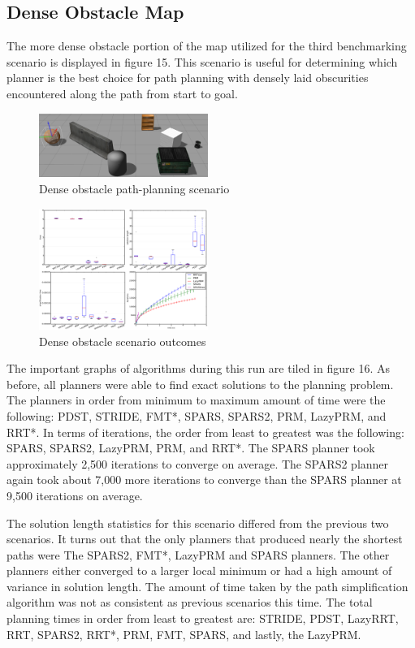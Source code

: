 \documentclass[conference]{IEEEtran} \usepackage[T1]{fontenc} \usepackage[backend=biber, style=ieee]{biblatex}
\begin{document}
\subsection{Dense Obstacle Map} \label{Dense Obstacle Map}

The more dense obstacle portion of the map utilized for the third benchmarking scenario is displayed in figure 15. This scenario is useful for determining which planner is 
the best choice for path planning with densely laid obscurities encountered along the path from start to goal.

\begin{figure}
\label{figure15} 
\centering 
\includegraphics[width=0.49\textwidth]{scenario_3}
\caption{Dense obstacle path-planning scenario}
\end{figure}

\begin{figure}
\label{figure16} 
\centering 
\includegraphics[width=0.49\textwidth]{s3_outcomes}
\caption{Dense obstacle scenario outcomes}
\end{figure}

The important graphs of algorithms during this run are tiled in figure 16. As before, all planners were able to find exact solutions to the planning problem. The planners in order 
from minimum to maximum amount of time were the following: PDST, STRIDE, FMT*, SPARS, SPARS2, PRM, LazyPRM, and RRT*. In terms of iterations, the order from least to greatest was 
the following: SPARS, SPARS2, LazyPRM, PRM, and RRT*. The SPARS planner took approximately 2,500 iterations to converge on average. The SPARS2 planner again took about 7,000 more iterations to converge than the SPARS planner at 9,500 iterations on average. 

The solution length statistics for this scenario differed from the previous two scenarios. It turns out that the only planners that produced nearly the shortest paths were The
SPARS2, FMT*, LazyPRM and SPARS planners. The other planners either converged to a larger local minimum or had a high amount of variance in solution length. The amount of time 
taken by the path simplification algorithm was not as consistent as previous scenarios this time. The total planning times in order from least to greatest are: STRIDE,
PDST, LazyRRT, RRT, SPARS2, RRT*, PRM, FMT, SPARS, and lastly, the LazyPRM.
\end{document}
